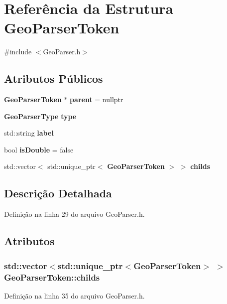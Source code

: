 \section{Referência da Estrutura Geo\+Parser\+Token}
\label{struct_geo_parser_token}


{\ttfamily \#include $<$Geo\+Parser.\+h$>$}

\subsection*{Atributos Públicos}
\begin{DoxyCompactItemize}
\item 
{\bf Geo\+Parser\+Token} $\ast$ {\bf parent} = nullptr
\item 
{\bf Geo\+Parser\+Type} {\bf type}
\item 
std\+::string {\bf label}
\item 
bool {\bf is\+Double} = false
\item 
std\+::vector$<$ std\+::unique\+\_\+ptr$<$ {\bf Geo\+Parser\+Token} $>$ $>$ {\bf childs}
\end{DoxyCompactItemize}


\subsection{Descrição Detalhada}


Definição na linha 29 do arquivo Geo\+Parser.\+h.



\subsection{Atributos}
\subsubsection[{childs}]{\setlength{\rightskip}{0pt plus 5cm}std\+::vector$<$std\+::unique\+\_\+ptr$<${\bf Geo\+Parser\+Token}$>$ $>$ Geo\+Parser\+Token\+::childs}\label{struct_geo_parser_token_aa6a8ff2bd23a18439dda820e2b95669a}


Definição na linha 35 do arquivo Geo\+Parser.\+h.


